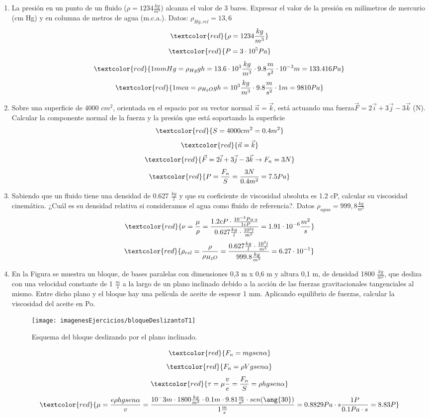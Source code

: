 \begin{enumerate}
\begin{figure}[H]
\begin{minipage}{0.3\textwidth}
	\end{minipage}
\end{figure}

	\newpage
	\item La presión en un punto de un fluido ($\rho = 1234 \frac{kg}{m^3}$) alcanza el valor de 3 bares. Expresar
	el valor de la presión en milímetros de mercurio (cm Hg) y en columna de metros de agua
	(m.c.a.). Datos: $\rho_{Hg,rel} = 13,6$
	\[\textcolor{red}{\rho = 1234 \frac{kg}{m^3}}\]
	\[\textcolor{red}{P=3\cdot10^5 Pa}\]
	\[\textcolor{red}{1mmHg=\rho_{Hg}g h=13.6\cdot10^3\frac{kg}{m^3} \cdot9.8 \frac{m}{s^2}\cdot10^{-3}m=133.416Pa} \]
	\[\textcolor{red}{1mca=\rho_{H_2O}g h=10^3\frac{kg}{m^3}\cdot9.8 \frac{m}{s^2}\cdot1m=9810Pa}\]
	\item Sobre una superficie de 4000 $cm^2$, orientada en el espacio por su vector normal $\vec{n}=\vec{k}$, está
	actuando una fuerza$\vec{F}=2\vec{i}+3\vec{j}-3\vec{k}$ (N). Calcular la componente normal de la fuerza y
	la presión que está soportando la superficie
		\[\textcolor{red}{S=4000 cm^2=0.4 m^2}\]
	\[\textcolor{red}{\vec{n}=\vec{k}}\]
	\[\textcolor{red}{\vec{F}=2\vec{i}+3\vec{j}-3\vec{k} \rightarrow F_n=3N}\]
	\[\textcolor{red}{P=\frac{F_n}{S}=\frac{3 N}{0.4 m^2}=7.5Pa}\]
	
	\item Sabiendo que un fluido tiene una densidad de 0.627 $\frac{kg}{l}$ y que su coeficiente de viscosidad
	absoluta es 1.2 cP, calcular su viscosidad cinemática. ¿Cuál es su densidad relativa si
	consideramos el agua como fluido de referencia?. Datos $\rho_{agua} = 999,8\frac{kg}{m^3}$
\[\textcolor{red}{\nu = \frac{\mu}{\rho}=\frac{1.2 cP \cdot \frac{10^{-3} Pa \cdot s}{1 cP}}{0.627 \frac{kg}{l}\cdot\frac{10^3 l}{m^3}}=1.91\cdot10^{-6}\frac{m^2}{s}}\]
\[\textcolor{red}{\rho_{rel}=\frac{\rho}{\rho_{H_2O}}=\frac{0.627 \frac{kg}{l}\cdot\frac{10^3 l}{m^3}}{999.8 \frac{kg}{m^3}}=6.27\cdot10^{-1}}\]
	
	\newpage
	\item En la Figura se muestra un bloque, de bases paralelas con dimensiones 0,3 m x 0,6
	m y altura 0,1 m, de densidad 1800 $\frac{kg}{m^3}$, que desliza con una velocidad constante de
	1 $\frac{m}{s}$ a la largo de un plano inclinado debido a la acción de las fuerzas gravitacionales
	tangenciales al mismo. Entre dicho plano y el bloque hay una película de aceite de espesor
	1 mm. Aplicando equilibrio de fuerzas, calcular la viscosidad del aceite en Po.
	\begin{figure}[H]
		
		\centering
		\texttt{[image: imagenesEjercicios/bloqueDeslizantoT1]}
		\caption{Esquema del bloque deslizando por el plano inclinado.}
		\label{fig:bloquedeslizantot1}
	\end{figure}
	\[\textcolor{red}{F_n=m g sen\alpha}\]
	\[\textcolor{red}{F_n=\rho V g sen\alpha}\]
	\[\textcolor{red}{\tau=\mu\frac{v}{e}=\frac{F_n}{S}=\rho h g sen\alpha}\]
	\[\textcolor{red}{\mu=\frac{e\rho h g sen\alpha}{v}=\frac{10^-3m\cdot1800\frac{kg}{m^3}\cdot0.1m\cdot 9.81 \frac{m}{s^2} \cdot sen(\ang{30})}{1\frac{m}{s}}=0.8829Pa\cdot s\frac{1 P}{0.1 Pa \cdot s}=8.83P}\]
\end{enumerate}
